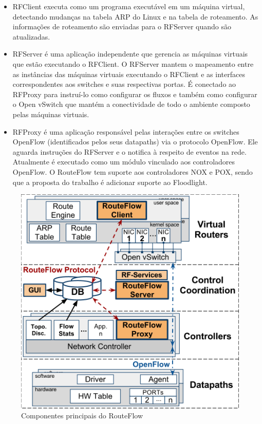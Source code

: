 \begin{itemize}
\item RFClient executa como um programa executável em um máquina virtual, detectando mudanças na tabela ARP do Linux e na tabela de roteamento. As informações de roteamento são enviadas para o RFServer quando são atualizadas.

\item RFServer é uma aplicação independente que gerencia as máquinas virtuais que estão executando o RFClient. O RFServer mantem o mapeamento entre as instâncias das máquinas virtuais executando o RFClient e as interfaces correspondentes aos switches e suas respectivas portas. É conectado ao RFProxy para instruí-lo como configurar os fluxos e também como configurar o Open vSwitch que mantém a conectividade de todo o ambiente composto pelas máquinas virtuais.

\item RFProxy é uma aplicação responsável pelas interações entre os switches OpenFlow (identificados pelos seus datapaths) via o protocolo OpenFlow. Ele aguarda instruções do RFServer e o notifica à respeito de eventos na rede. Atualmente é executado como um módulo vinculado aos controladores OpenFlow. O RouteFlow tem suporte aos controladores NOX e POX, sendo que a proposta do trabalho é adicionar suporte ao Floodlight.
\end{itemize}

\begin{figure}[hb]
\centering
\includegraphics[width=125mm]{componentesRouteFlow.png}
\caption{Componentes principais do RouteFlow}
\label{fig:componentesRouteFlow}
\end{figure}

